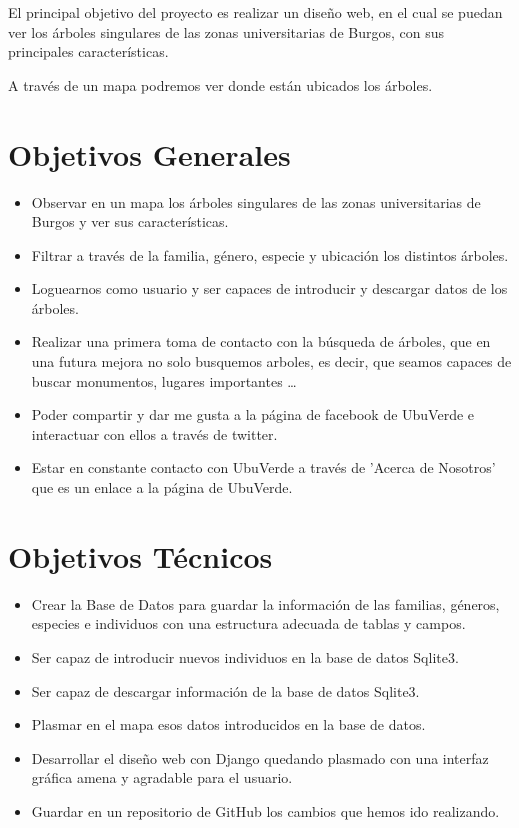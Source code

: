 
El principal objetivo del proyecto es realizar un diseño web, en el cual se puedan ver los árboles singulares de las zonas universitarias de Burgos, con sus principales características.

A través de un mapa podremos ver donde están ubicados los árboles. 
\section{Objetivos Generales}
\begin{itemize}
	\item Observar en un mapa los árboles singulares de las zonas universitarias de Burgos y ver sus características.
	\item Filtrar a través de la familia, género, especie y ubicación los distintos árboles.
	\item Loguearnos como usuario y ser capaces de introducir y descargar datos de los árboles.
	\item Realizar una primera toma de contacto con la búsqueda de árboles, que en una futura mejora no solo busquemos arboles, es decir, que seamos capaces de buscar monumentos, lugares importantes \ldots
	\item Poder compartir y dar me gusta a la página de facebook de UbuVerde e interactuar con ellos a través de twitter. 
	\item Estar en constante contacto con UbuVerde a través de 'Acerca de Nosotros' que es un enlace a la página de UbuVerde.
	
\end{itemize}
\newpage

\section{Objetivos Técnicos}
\begin{itemize}
	\item Crear la Base de Datos para guardar la información de las familias, géneros, especies e individuos con una estructura adecuada de tablas y campos.
	\item Ser capaz de introducir nuevos individuos en la base de datos Sqlite3.
	\item Ser capaz de descargar información de la base de datos Sqlite3.
	\item Plasmar en el mapa esos datos introducidos en la base de datos. 
	\item Desarrollar el diseño web con Django quedando plasmado con una interfaz gráfica amena y agradable para el usuario.
	\item Guardar en un repositorio de GitHub los cambios que hemos ido realizando.
	 
\end{itemize}

